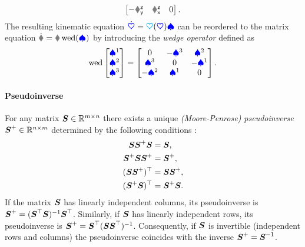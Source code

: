 \begin{Example}
\begin{align}
\begin{bmatrix}
  -\Rzy & \Rzx & 0
 \end{bmatrix}.
\end{align}
The resulting kinematic equation $\dot{\boldsymbol{\textcolor{blue}{\heartsuit}}} = \boldsymbol{\textcolor{cyan}{\heartsuit}}(\boldsymbol{\textcolor{blue}{\heartsuit}}) \boldsymbol{\textcolor{blue}{\spadesuit}}$ can be reordered to the matrix equation $\Rd = \R \wedOp(\sysVel)$ by introducing the \textit{wedge operator} defined as
\begin{align}
 \operatorname{wed} \begin{bmatrix} \textcolor{blue}{\spadesuit}^{1} \\ \textcolor{blue}{\spadesuit}^{2} \\ \textcolor{blue}{\spadesuit}^{3} \end{bmatrix} = \begin{bmatrix} 0 & -\textcolor{blue}{\spadesuit}^{3} & \textcolor{blue}{\spadesuit}^{2} \\ \textcolor{blue}{\spadesuit}^{3} & 0 & -\textcolor{blue}{\spadesuit}^{1} \\ -\textcolor{blue}{\spadesuit}^{2} & \textcolor{blue}{\spadesuit}^{1} & 0 \end{bmatrix}.
\end{align}
\end{Example}

\paragraph{Pseudoinverse}
For any matrix $\boldsymbol{S}\in\mathbb{R}^{m\times n}$ there exists a unique \textit{(Moore-Penrose) pseudoinverse} $\boldsymbol{S}^+ \in \mathbb{R}^{n\times m}$ determined by the following conditions \cite[Theo.\ 1]{Penrose:Pseudoinverse}:
\begin{subequations}\label{eq:PenroseConditions}
\begin{align}
 \boldsymbol{S} \boldsymbol{S}^+ \boldsymbol{S} &= \boldsymbol{S},
\\
 \boldsymbol{S}^+ \boldsymbol{S} \boldsymbol{S}^+ &= \boldsymbol{S}^+,
\\
 (\boldsymbol{S} \boldsymbol{S}^+)^\top &= \boldsymbol{S} \boldsymbol{S}^+,
\\
 (\boldsymbol{S}^+ \boldsymbol{S})^\top &= \boldsymbol{S}^+ \boldsymbol{S}.
\end{align}
\end{subequations}
If the matrix $\boldsymbol{S}$ has linearly independent columns, its pseudoinverse is $\boldsymbol{S}^+ = (\boldsymbol{S}^\top \boldsymbol{S})^{-1} \boldsymbol{S}^\top$.
Similarly, if $\boldsymbol{S}$ has linearly independent rows, its pseudoinverse is $\boldsymbol{S}^+ = \boldsymbol{S}^\top (\boldsymbol{S} \boldsymbol{S}^\top)^{-1}$.
Consequently, if $\boldsymbol{S}$ is invertible (independent rows and columns) the pseudoinverse coincides with the inverse $\boldsymbol{S}^+ = \boldsymbol{S}^{-1}$.

